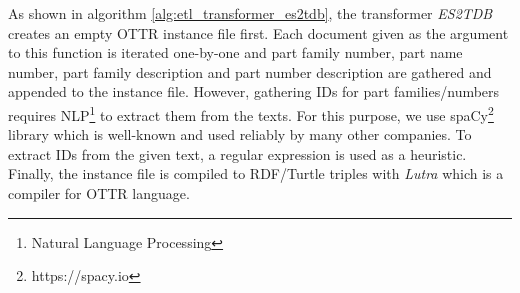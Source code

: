 % 
% 
% 
% 
% 

As shown in algorithm \ref{alg:etl_transformer_es2tdb}, the transformer \textit{ES2TDB} creates 
an empty OTTR instance file first. Each document given as the argument to this function is iterated 
one-by-one and part family number, part name number, part family description and part number 
description are gathered and appended to the instance file. However, gathering IDs for part 
families/numbers requires NLP\footnote{Natural Language Processing} to extract them from the texts. 
For this purpose, we use spaCy\footnote{https://spacy.io} library which is well-known and used 
reliably by many other companies. To extract IDs from the given text, a regular expression is used 
as a heuristic. Finally, the instance file is compiled to RDF/Turtle triples with \textit{Lutra} 
which is a compiler for OTTR language.

